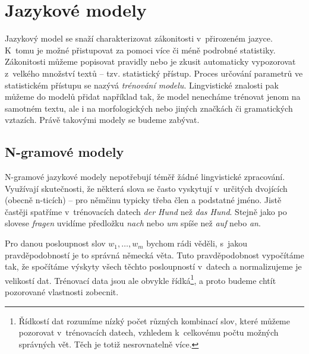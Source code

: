 \documentclass[12pt,a4paper]{report}
\newcommand{\argmax}[1]{\underset{#1}{\operatorname{arg}\,\operatorname{max}}\;}
\begin{document}
\chapter{Jazykové modely}
Jazykový model se snaží charakterizovat zákonitosti v~přirozeném jazyce. K~tomu je možné přistupovat za pomoci více či méně podrobné statistiky. Zákonitosti můžeme popisovat pravidly nebo je zkusit automaticky vypozorovat z~velkého množství textů -- tzv. statistický přístup. Proces určování parametrů ve statistickém přístupu se nazývá \textit{trénování modelu}. Lingvistické znalosti pak můžeme do modelů přidat například tak, že model nenecháme trénovat jenom na samotném textu, ale i na morfologických nebo jiných značkách či gramatických vztazích. Právě takovými modely se budeme zabývat.

%

\section{N-gramové modely}
N-gramové jazykové modely nepotřebují téměř žádné lingvistické zpracování. Využívají skutečnosti, že některá slova se často vyskytují v~určitých dvojících (obecně n-ticích) -- pro němčinu typicky třeba člen a podstatné jméno. Jistě častěji spatříme v~trénovacích datech \textit{der Hund} než \textit{das Hund}. Stejně jako po slovese \textit{fragen} uvidíme předložku \textit{nach} nebo \textit{um} spíše než \textit{auf} nebo \textit{an}.

Pro danou posloupnost slov $w_{1},\ldots,w_{m}$ bychom rádi věděli, s~jakou pravděpodobností je to správná německá věta. Tuto pravděpodobnost vypočítáme tak, že spočítáme výskyty všech těchto posloupností v~datech a normalizujeme je velikostí dat. Trénovací data jsou ale obvykle řídká\footnote{Řídkostí dat rozumíme nízký počet různých kombinací slov, které můžeme pozorovat v~trénovacích datech, vzhledem k~celkovému počtu možných správných vět. Těch je totiž nesrovnatelně více.}, a proto budeme chtít pozorované vlastnosti zobecnit.
\end{document}
